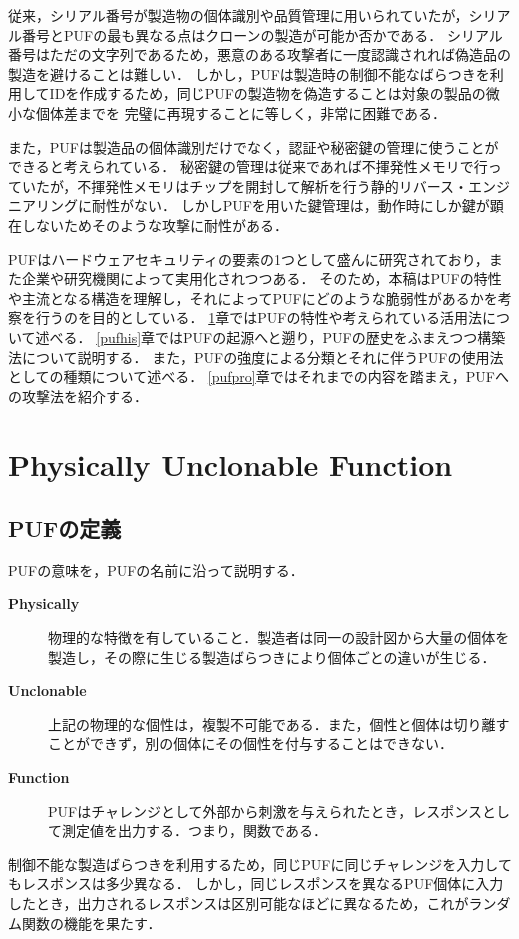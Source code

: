 \documentclass[technicalreport]{ieicej} %
\begin{document}
従来，シリアル番号が製造物の個体識別や品質管理に用いられていたが，シリアル番号とPUFの最も異なる点はクローンの製造が可能か否かである．
シリアル番号はただの文字列であるため，悪意のある攻撃者に一度認識されれば偽造品の製造を避けることは難しい．
しかし，PUFは製造時の制御不能なばらつきを利用してIDを作成するため，同じPUFの製造物を偽造することは対象の製品の微小な個体差までを
完璧に再現することに等しく，非常に困難である．

また，PUFは製造品の個体識別だけでなく，認証や秘密鍵の管理に使うことができると考えられている．
秘密鍵の管理は従来であれば不揮発性メモリで行っていたが，不揮発性メモリはチップを開封して解析を行う静的リバース・エンジニアリングに耐性がない．
しかしPUFを用いた鍵管理は，動作時にしか鍵が顕在しないためそのような攻撃に耐性がある．

PUFはハードウェアセキュリティの要素の1つとして盛んに研究されており，また企業や研究機関によって実用化されつつある．
そのため，本稿はPUFの特性や主流となる構造を理解し，それによってPUFにどのような脆弱性があるかを考察を行うのを目的としている．
\ref{puf}章ではPUFの特性や考えられている活用法について述べる．
\ref{pufhis}章ではPUFの起源へと遡り，PUFの歴史をふまえつつ構築法について説明する．
また，PUFの強度による分類とそれに伴うPUFの使用法としての種類について述べる．
\ref{pufpro}章ではそれまでの内容を踏まえ，PUFへの攻撃法を紹介する．
\section{Physically Unclonable Function}
\label{puf}
\subsection{PUFの定義}
PUFの意味を，PUFの名前に沿って説明する．
\begin{description}
  \item[\textbf{Physically}]物理的な特徴を有していること．製造者は同一の設計図から大量の個体を製造し，その際に生じる製造ばらつきにより個体ごとの違いが生じる．
  \item[\textbf{Unclonable}]上記の物理的な個性は，複製不可能である．また，個性と個体は切り離すことができず，別の個体にその個性を付与することはできない．
  \item[\textbf{Function}]PUFはチャレンジとして外部から刺激を与えられたとき，レスポンスとして測定値を出力する．つまり，関数である．
\end{description}


制御不能な製造ばらつきを利用するため，同じPUFに同じチャレンジを入力してもレスポンスは多少異なる．
しかし，同じレスポンスを異なるPUF個体に入力したとき，出力されるレスポンスは区別可能なほどに異なるため，これがランダム関数の機能を果たす．
\end{document}
